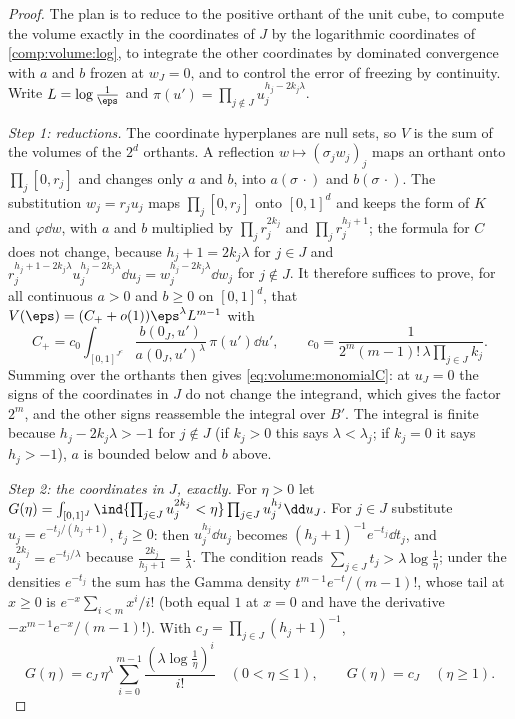 \begin{refsection}
\begin{proof}
The plan is to reduce to the positive orthant of the unit cube, to compute the volume exactly in the coordinates of $J$ by the logarithmic coordinates of \cref{comp:volume:log}, to integrate the other coordinates by dominated convergence with $a$ and $b$ frozen at $w_J=0$, and to control the error of freezing by continuity. Write $L=\log\frac1\eps$ and $\pi(u')=\prod_{j\notin J}u_j^{h_j-2k_j\lambda}$.

\emph{Step 1: reductions.} The coordinate hyperplanes are null sets, so $V$ is the sum of the volumes of the $2^d$ orthants. A reflection $w\mapsto(\sigma_jw_j)_j$ maps an orthant onto $\prod_j[0,r_j]$ and changes only $a$ and $b$, into $a(\sigma\,\cdot)$ and $b(\sigma\,\cdot)$. The substitution $w_j=r_ju_j$ maps $\prod_j[0,r_j]$ onto $[0,1]^d$ and keeps the form of $K$ and $\varphi\dd w$, with $a$ and $b$ multiplied by $\prod_jr_j^{2k_j}$ and $\prod_jr_j^{h_j+1}$; the formula for $C$ does not change, because $h_j+1=2k_j\lambda$ for $j\in J$ and $r_j^{h_j+1-2k_j\lambda}u_j^{h_j-2k_j\lambda}\dd u_j=w_j^{h_j-2k_j\lambda}\dd w_j$ for $j\notin J$. It therefore suffices to prove, for all continuous $a>0$ and $b\ge0$ on $[0,1]^d$, that $V(\eps)=(C_++o(1))\eps^\lambda L^{m-1}$ with
\begin{equation}\label{eq:volume:orthant}
C_+=c_0\int_{[0,1]^{J^c}}\frac{b(0_J,u')}{a(0_J,u')^\lambda}\,\pi(u')\dd u',\qquad c_0=\frac{1}{2^m(m-1)!\,\lambda\prod_{j\in J}k_j}.
\end{equation}
Summing over the orthants then gives \eqref{eq:volume:monomialC}: at $u_J=0$ the signs of the coordinates in $J$ do not change the integrand, which gives the factor $2^m$, and the other signs reassemble the integral over $B'$. The integral is finite because $h_j-2k_j\lambda>-1$ for $j\notin J$ (if $k_j>0$ this says $\lambda<\lambda_j$; if $k_j=0$ it says $h_j>-1$), $a$ is bounded below and $b$ above.

\emph{Step 2: the coordinates in $J$, exactly.} For $\eta>0$ let $G(\eta)=\int_{[0,1]^J}\ind\{\prod_{j\in J}u_j^{2k_j}<\eta\}\prod_{j\in J}u_j^{h_j}\dd u_J$. For $j\in J$ substitute $u_j=e^{-t_j/(h_j+1)}$, $t_j\ge0$: then $u_j^{h_j}\dd u_j$ becomes $(h_j+1)^{-1}e^{-t_j}\dd t_j$, and $u_j^{2k_j}=e^{-t_j/\lambda}$ because $\frac{2k_j}{h_j+1}=\frac1\lambda$. The condition reads $\sum_{j\in J}t_j>\lambda\log\frac1\eta$; under the densities $e^{-t_j}$ the sum has the Gamma density $t^{m-1}e^{-t}/(m-1)!$, whose tail at $x\ge0$ is $e^{-x}\sum_{i<m}x^i/i!$ (both equal $1$ at $x=0$ and have the derivative $-x^{m-1}e^{-x}/(m-1)!$). With $c_J=\prod_{j\in J}(h_j+1)^{-1}$,
\begin{equation}\label{eq:volume:gammatail}
G(\eta)=c_J\,\eta^\lambda\sum_{i=0}^{m-1}\frac{(\lambda\log\frac1\eta)^i}{i!}\quad(0<\eta\le1),\qquad G(\eta)=c_J\quad(\eta\ge1).
\end{equation}


\end{proof}
\end{refsection}
